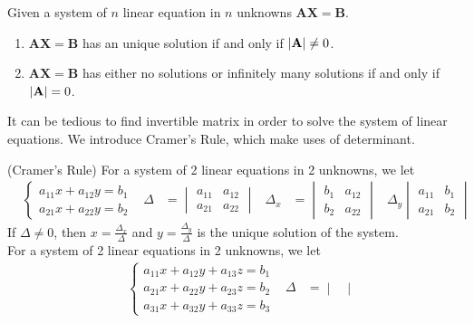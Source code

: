 \documentclass{huhtakm-template-book}
\begin{document}
\begin{lem}
    Given a system of $n$ linear equation in $n$ unknowns $\mathbf{AX}=\mathbf{B}$.
    \begin{enumerate}
        \item $\mathbf{AX}=\mathbf{B}$ has an unique solution if and only if $\left|{\mathbf{A}}\right|\neq 0$.
        \item $\mathbf{AX}=\mathbf{B}$ has either no solutions or infinitely many solutions if and only if $\left|{\mathbf{A}}\right|=0$.
    \end{enumerate}
\end{lem}
It can be tedious to find invertible matrix in order to solve the system of linear equations. We introduce Cramer's Rule, which make uses of determinant.
\begin{thm}(Cramer's Rule)
    For a system of 2 linear equations in 2 unknowns, we let
    \begin{align*}
        &\begin{cases}
            a_{11}x+a_{12}y=b_{1}\\
            a_{21}x+a_{22}y=b_{2}
        \end{cases} &
        \Delta&=\begin{vmatrix}
            a_{11} & a_{12}\\
            a_{21} & a_{22}
        \end{vmatrix} & \Delta_{x}&=\begin{vmatrix}
            b_{1} & a_{12}\\
            b_{2} & a_{22}
        \end{vmatrix} & \Delta_{y}\begin{vmatrix}
            a_{11} & b_{1}\\
            a_{21} & b_{2}
        \end{vmatrix}
    \end{align*}
    If $\Delta\neq 0$, then $x=\frac{\Delta_{x}}{\Delta}$ and $y=\frac{\Delta_{y}}{\Delta}$ is the unique solution of the system.\\
    For a system of 2 linear equations in 2 unknowns, we let
    \begin{align*}
        &\begin{cases}
            a_{11}x+a_{12}y+a_{13}z=b_{1}\\
            a_{21}x+a_{22}y+a_{23}z=b_{2}\\
            a_{31}x+a_{32}y+a_{33}z=b_{3}
        \end{cases} &
        \Delta&=\begin{vmatrix}

\end{vmatrix}
\end{align*}
\end{thm}
\end{document}
